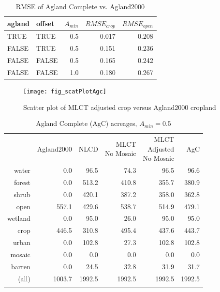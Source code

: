 \begin{table}[ht]
\begin{center}
\begin{tabular}{llrrr}
  \hline
agland & offset & $A_{min}$ & $RMSE_{crop}$ & $RMSE_{open}$ \\ 
  \hline
TRUE & TRUE & 0.5 & 0.017 & 0.208 \\ 
  FALSE & TRUE & 0.5 & 0.151 & 0.236 \\ 
  FALSE & FALSE & 0.5 & 0.165 & 0.242 \\ 
  FALSE & FALSE & 1.0 & 0.180 & 0.267 \\ 
   \hline
\end{tabular}
\caption{RMSE of Agland Complete vs. Agland2000}
\label{tab:rmse3}
\end{center}
\end{table}
\begin{figure}[hpt] 
  \begin{center} 


    \texttt{[image: fig\_scatPlotAgc]}
  \end{center} 
  \caption{Scatter plot of MLCT adjusted crop versus Agland2000 cropland}
  \label{fig:scatPlotAgc} 
\end{figure} 

\begin{table}[ht]
\begin{center}
{\small
\begin{tabular}{rrrrrr}
  \hline
 & Agland2000 & NLCD & \pbox[c][][c]{3in}{MLCT\\No Mosaic} & \pbox[c][][c]{3in}{\smallskip{}MLCT\\Adjusted\\No Mosaic} & AgC \\ 
  \noalign{\smallskip} \hline
water & 0.0 & 96.5 & 74.3 & 96.5 & 96.6 \\ 
  forest & 0.0 & 513.2 & 410.8 & 355.7 & 380.9 \\ 
  shrub & 0.0 & 420.1 & 387.2 & 358.0 & 362.8 \\ 
  open & 557.1 & 429.6 & 538.7 & 514.9 & 479.1 \\ 
  wetland & 0.0 & 95.0 & 26.0 & 95.0 & 95.0 \\ 
  crop & 446.5 & 310.8 & 495.4 & 437.6 & 443.7 \\ 
  urban & 0.0 & 102.8 & 27.3 & 102.8 & 102.8 \\ 
  mosaic & 0.0 & 0.0 & 0.0 & 0.0 & 0.0 \\ 
  barren & 0.0 & 24.5 & 32.8 & 31.9 & 31.7 \\ 
  (all) & 1003.7 & 1992.5 & 1992.5 & 1992.5 & 1992.5 \\ 
   \noalign{\smallskip} \hline
\end{tabular}
}
\caption{Agland Complete (AgC) acreages, $A_{min}=0.5$}
\label{tab:areas3}
\end{center}
\end{table}


